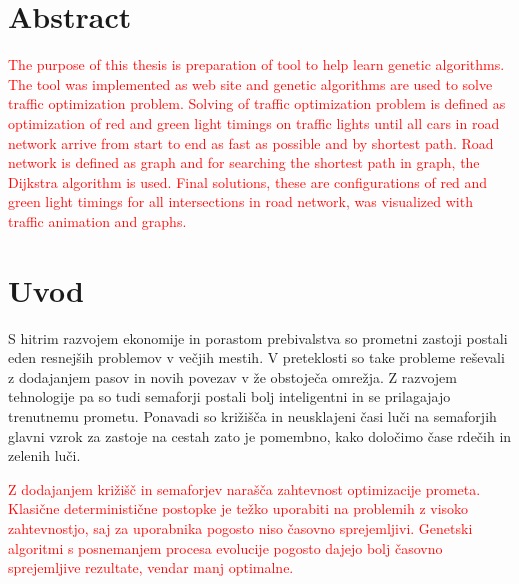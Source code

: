 \documentclass[a4paper, 12pt]{book}
\newcommand{\clearemptydoublepage}{\newpage{\pagestyle{empty}\cleardoublepage}}
\begin{document}
\clearemptydoublepage

\chapter*{Abstract}
\textcolor{red}{The purpose of this thesis is preparation of tool to help learn genetic algorithms. The tool was implemented as web site and genetic algorithms are used to solve traffic optimization problem. Solving of traffic optimization problem is defined as optimization of red and green light timings on traffic lights until all cars in road network arrive from start to end as fast as possible and by shortest path. Road network is defined as graph and for searching the shortest path in graph, the Dijkstra algorithm is used. Final solutions, these are configurations of red and green light timings for all intersections in road network, was visualized with traffic animation and graphs. }
\clearemptydoublepage

\mainmatter
\setcounter{page}{1}
\pagestyle{fancy}

\chapter{Uvod}
\label{ch1}

S hitrim razvojem ekonomije in porastom prebivalstva so prometni zastoji postali eden resnej\v sih problemov v ve\v cjih mestih. V preteklosti so take probleme re\v sevali z dodajanjem pasov in novih povezav v \v ze obstoje\v ca omre\v zja. Z razvojem tehnologije pa so tudi semaforji postali bolj inteligentni in se prilagajajo trenutnemu prometu. 
Ponavadi so kri\v zi\v s\v ca  in neusklajeni \v casi lu\v ci na semaforjih glavni vzrok za zastoje na cestah zato je pomembno, kako dolo\v cimo \v case rde\v cih in zelenih lu\v ci. 
\cite{he12-aes.pdf}

\textcolor{red}{Z dodajanjem kri\v zi\v s\v c in semaforjev nara\v s\v ca zahtevnost optimizacije prometa. Klasi\v cne deterministi\v cne postopke je te\v zko uporabiti na problemih z visoko zahtevnostjo, saj za uporabnika pogosto niso \v casovno sprejemljivi. Genetski algoritmi s posnemanjem procesa evolucije pogosto dajejo bolj \v casovno sprejemljive rezultate, vendar manj optimalne.}
\end{document}
